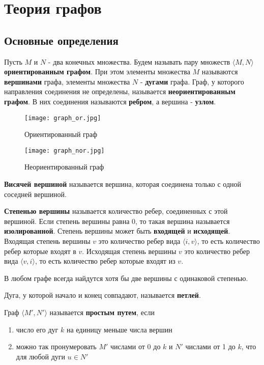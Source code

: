 \chapter{Теория графов}
\section{Основные определения}
Пусть $M$ и $N$ - два конечных множества. Будем называть пару множеств $\langle M, N \rangle$ \textbf{ориентированным графом}.
При этом элементы множества $M$ называются \textbf{вершинами} графа, элементы множества $N$ - \textbf{дугами} графа. 
Граф, у которого направления соединения не определены, называется \textbf{неориентированным графом}. В них
соединения называются \textbf{ребром}, а вершина - \textbf{узлом}.

\begin{figure*}[!h]
    \centering
    \begin{minipage}[t]{4cm}
        \centering
        \texttt{[image: graph\_or.jpg]}
        \caption{Ориентированный граф}
    \end{minipage}
    \hspace{3cm}
    \begin{minipage}[t]{4cm}
        \centering
        \texttt{[image: graph\_nor.jpg]}
        \caption{Неориентированный граф}
    \end{minipage}
\end{figure*}

\textbf{Висячей вершиной} называется вершина, которая соединена только с одной соседней вершиной.

\textbf{Степенью вершины} называется количество ребер, соединенных с этой вершиной.
Если степень вершины равна 0, то такая вершина называется \textbf{изолированной}.
Степень вершины может быть \textbf{входящей} и \textbf{исходящей}. Входящая степень вершины $v$
это количество ребер вида $\langle i, v \rangle$, то есть количество ребер которые входят в $v$.
Исходящая степень вершины $v$ это количество ребер вида $\langle v, i \rangle$, то есть количество ребер
которые входят из $v$.

\begin{thm}
    В любом графе всегда найдутся хотя бы две вершины с одинаковой степенью.
\end{thm}

Дуга, у которой начало и конец совпадают, называется \textbf{петлей}.

Граф $\langle M', N'\rangle$ называется \textbf{простым путем}, если
\begin{enumerate}
    \item число его дуг $k$ на единицу меньше числа вершин
    \item можно так пронумеровать $M'$ числами от 0 до $k$ и $N'$ числами от 1 до $k$,
    что для любой дуги $u \in N'$
\end{enumerate}

